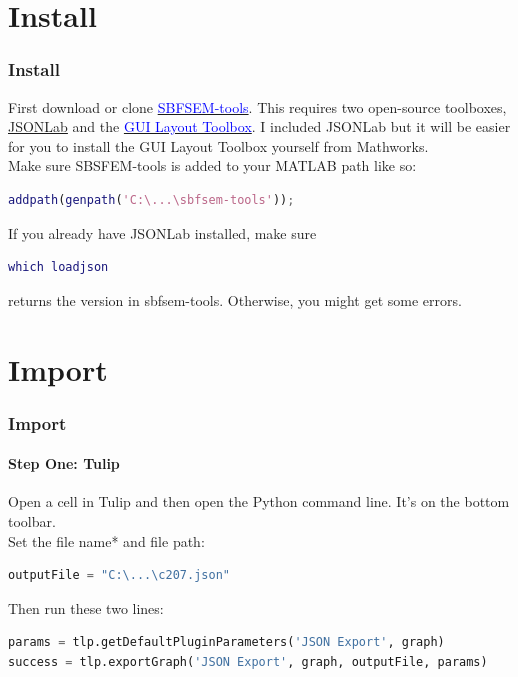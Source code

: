 \documentclass[11pt]{beamer}
\begin{document}
\section{Install}
\begin{frame}[fragile]
	\frametitle{Install}
	First download or clone \href{www.github.com/sarastokes/sbfsem-tools}{\textcolor{blue}{SBFSEM-tools}}.
	This requires two open-source toolboxes, \href{https://www.mathworks.com/matlabcentral/fileexchange/33381-jsonlab--a-toolbox-to-encode-decode-json-files}{JSONLab} and the \href{https://www.mathworks.com/matlabcentral/fileexchange/47982-gui-layout-toolbox}{\textcolor{blue}{GUI Layout Toolbox}}. I included JSONLab but it will be easier for you to install the GUI Layout Toolbox yourself from Mathworks.\\
	Make sure SBSFEM-tools is added to your MATLAB path like so:
	\begin{lstlisting}[language=matlab]	
	addpath(genpath('C:\...\sbfsem-tools'));\end{lstlisting}
	If you already have JSONLab installed, make sure 
	\begin{lstlisting}[language=matlab] 
	which loadjson\end{lstlisting} 
	returns the version in sbfsem-tools. Otherwise, you might get some errors.
\end{frame}
\section{Import}

\begin{frame}[fragile]
	\frametitle{Import}
	\framesubtitle{Step One: Tulip}
	\begin{block}{}
		Open a cell in Tulip and then open the Python command line. It's on the bottom toolbar.\\
		Set the file name* and file path:
		\begin{lstlisting}[language=python]
outputFile = "C:\...\c207.json"\end{lstlisting}
		Then run these two lines:
		\begin{lstlisting}[language=python]
params = tlp.getDefaultPluginParameters('JSON Export', graph)
success = tlp.exportGraph('JSON Export', graph, outputFile, params)\end{lstlisting}
	\end{block}
\end{frame}
\end{document}
